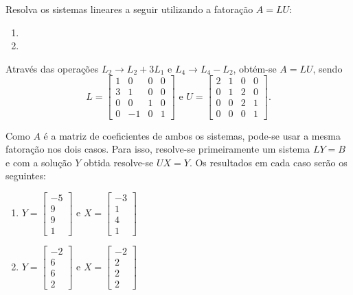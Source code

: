 \documentclass[12pt,a4paper]{article}
\begin{document}
\begin{ExerciseList}
\Exercise[title={2,5}]
Resolva os sistemas lineares a seguir utilizando a fatoração $A = LU$:
\begin{multicols}{2}
\begin{enumerate}
\item {}
\item {}
\end{enumerate}
\end{multicols}
\Answer
Através das operações $L_2 \to L_2 + 3L_1$ e $L_4 \to L_4 - L_2$, obtém-se $A = LU$, sendo
\[
L = \begin{bmatrix}
1 &  0 & 0 & 0\\
3 &  1 & 0 & 0\\
0 &  0 & 1 & 0\\
0 & -1 & 0 & 1
\end{bmatrix}
\text{ e }
U = \begin{bmatrix}
2 & 1 & 0 &  0\\
0 & 1 & 2 &  0\\
0 & 0 & 2 &  1\\
0 & 0 & 0 &  1
\end{bmatrix}.
\]

Como $A$ é a matriz de coeficientes de ambos os sistemas, pode-se usar a mesma fatoração nos dois casos. Para isso, resolve-se primeiramente um sistema $LY=B$ e com a solução $Y$ obtida resolve-se $UX = Y$. Os resultados em cada caso serão os seguintes:
\begin{multicols}{2}
\begin{enumerate}
\item
$
Y = \begin{bmatrix}
-5 \\ 9 \\9 \\ 1
\end{bmatrix}
\text{ e }
X = \begin{bmatrix}
-3 \\ 1 \\ 4 \\ 1
\end{bmatrix}
$
\item
$
Y  =
\begin{bmatrix}
-2 \\ 6 \\ 6 \\ 2
\end{bmatrix}
\text{ e }
 X  =
\begin{bmatrix}
-2 \\ 2 \\ 2 \\ 2
\end{bmatrix}$
\end{enumerate}
\end{multicols}


\end{ExerciseList}
\end{document}
